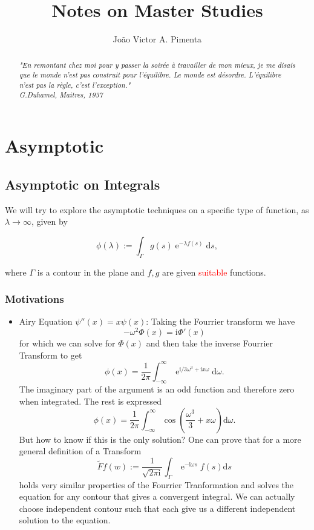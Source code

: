 \documentclass[]{report}
\title{Notes on Master Studies}
\author{João Victor A. Pimenta}
\DeclareMathOperator{\ee}{e}
\newcommand{\ii}{\mathrm{i}}
\newcommand{\dd}{\mathrm{d}}
\numberwithin{equation}{section} %
\begin{document}
\maketitle

\begin{abstract}
	\textit{"En remontant chez moi pour y passer la soirée à travailler de mon mieux, je me disais que le monde n'est pas construit pour l'équilibre. Le monde est désordre. L'équilibre n'est pas la règle, c'est l'exception."\\
	G.Duhamel, Maitres, 1937}
\end{abstract}

\chapter{Asymptotic}

\section{Asymptotic on Integrals}

We will try to explore the asymptotic techniques on a specific type of function, as $\lambda \rightarrow \infty$, given by 

\begin{equation}
	\phi(\lambda) := \int_{\Gamma} g(s) \ee^{-\lambda f(s)} \dd s,
\end{equation}

where $\Gamma$ is a contour in the plane and $f, g$ are given \textcolor{red}{suitable} functions.

\subsection{Motivations}

\begin{itemize}
	\item Airy Equation $\psi''(x) = x \psi(x)$: Taking the Fourrier transform we have $$-\omega^2 \Phi(x) = \ii \Phi'(x)$$ for which we can solve for $\Phi(x) $ and then take the inverse Fourrier Transform to get $$\phi(x) = \frac{1}{2\pi} \int_{-\infty}^{\infty} \ee^{\ii/3 \omega^3 + \ii x \omega} \dd \omega.$$ The imaginary part of the argument is an odd function and therefore zero when integrated. The rest is expressed $$\phi(x) = \frac{1}{2\pi} \int_{-\infty}^{\infty} \cos{\left( \frac{\omega^3}{3} + x \omega \right)} \dd \omega.$$ But how to know if this is the only solution? One can prove that for a more general definition of a Transform $$\tilde{F} f(w) := \frac{1}{\sqrt{2\pi \ii}} \int_{\Gamma} \ee^{-\ii \omega s} f(s) \dd s$$ holds very similar properties of the Fourrier Tranformation and solves the equation for any contour that gives a convergent integral. We can actually choose independent contour such that each give us a different independent solution to the equation.
\end{itemize}
\end{document}
